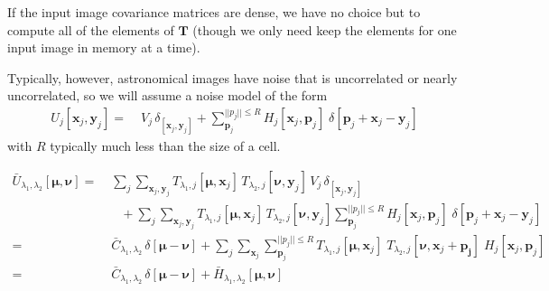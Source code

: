 \documentclass[DM,authoryear,toc]{lsstdoc}
\begin{document}
If the input image covariance matrices are dense, we have no choice but to compute all of the elements of $\bm{T}$ (though we only need keep the elements for one input image in memory at a time).

Typically, however, astronomical images have noise that is uncorrelated or nearly uncorrelated, so we will assume a noise model of the form
\begin{align}
    U_j[\bm{x}_j,\bm{y}_j]
    =&\;
    V_j\,\delta_[\bm{x}_j,\bm{y}_j]
    +
    \!\!\!\!
    \sum_{\bm{p}_j}^{||p_j|| \le R}
    \!\!
    H_j[\bm{x}_j, \bm{p}_j]
    \;
    \delta[\bm{p}_j+\bm{x}_j-\bm{y}_j]
\end{align}
with $R$ typically much less than the size of a cell.

\begin{align}
    \bar{U}_{\lambda_1,\lambda_2}[\bm{\mu},\bm{\nu}]
    =&\;
    \sum_j \sum_{\bm{x}_j,\bm{y}_j}
    T_{\lambda_1,j}[\bm{\mu},\bm{x}_j]
    \,
    T_{\lambda_2,j}[\bm{\nu},\bm{y}_j]
    \,
    V_j\,\delta_[\bm{x}_j,\bm{y}_j]
    \\
    &\quad+
    \sum_j \sum_{\bm{x}_j,\bm{y}_j}
    T_{\lambda_1,j}[\bm{\mu},\bm{x}_j]
    \,
    T_{\lambda_2,j}[\bm{\nu},\bm{y}_j]
    \sum_{\bm{p}_j}^{||p_j|| \le R}
    \!\!
    H_j[\bm{x}_j, \bm{p}_j]
    \;
    \delta[\bm{p}_j+\bm{x}_j-\bm{y}_j]
    \\
    =&\;
    \bar{C}_{\lambda_1,\lambda_2}
    \,
    \delta[\bm{\mu}-\bm{\nu}]
    +
    \sum_j \sum_{\bm{x}_j}
    \!\!\!\!
    \sum_{\bm{p}_j}^{||p_j|| \le R}
    \!\!
    T_{\lambda_1,j}[\bm{\mu},\bm{x}_j]
    \;
    T_{\lambda_2,j}[\bm{\nu},\bm{x}_j+\bm{p_j}]
    \;
    H_j[\bm{x}_j, \bm{p}_j]
    \\
    =&\;
    \bar{C}_{\lambda_1,\lambda_2}
    \,
    \delta[\bm{\mu}-\bm{\nu}]
    +
    \bar{H}_{\lambda_1,\lambda_2}[\bm{\mu}, \bm{\nu}]
\end{align}
\end{document}
